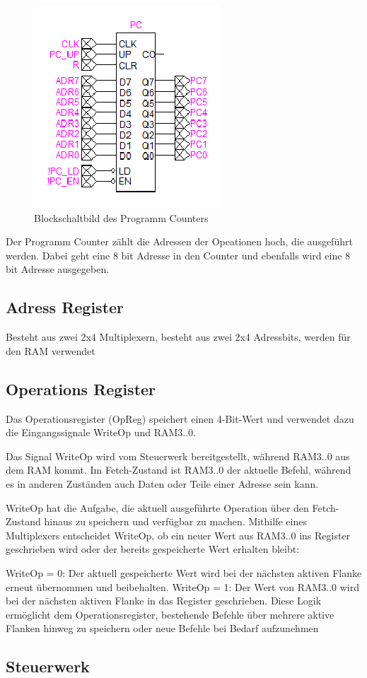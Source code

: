 \begin{figure}[ht]
  \centering
  \includegraphics[scale=0.6]
  {content/figures/Blockschaltbild-programm-counter.png}
  \caption{Blockschaltbild des Programm Counters}
  \label{fig:blockschaltbild-pc}
\end{figure}

Der Programm Counter zählt die Adressen der Opeationen hoch, die ausgeführt werden. Dabei geht eine 8 bit Adresse in den Counter und ebenfalls wird eine 8 bit Adresse ausgegeben.


\subsection{Adress Register}
\label{sec: adress-register}

Besteht aus zwei 2x4 Multiplexern, besteht aus zwei 2x4 Adressbits, werden für den RAM verwendet

\subsection{Operations Register}
\label{sec: operations-register}

Das Operationsregister (OpReg) speichert einen 4-Bit-Wert und verwendet dazu die Eingangssignale WriteOp und RAM3..0.

Das Signal WriteOp wird vom Steuerwerk bereitgestellt, während RAM3..0 aus dem RAM kommt. Im Fetch-Zustand ist RAM3..0 der aktuelle Befehl, während es in anderen Zuständen auch Daten oder Teile einer Adresse sein kann.

WriteOp hat die Aufgabe, die aktuell ausgeführte Operation über den Fetch-Zustand hinaus zu speichern und verfügbar zu machen. Mithilfe eines Multiplexers entscheidet WriteOp, ob ein neuer Wert aus RAM3..0 ins Register geschrieben wird oder der bereits gespeicherte Wert erhalten bleibt:

WriteOp = 0: Der aktuell gespeicherte Wert wird bei der nächsten aktiven Flanke erneut übernommen und beibehalten.
WriteOp = 1: Der Wert von RAM3..0 wird bei der nächsten aktiven Flanke in das Register geschrieben.
Diese Logik ermöglicht dem Operationsregister, bestehende Befehle über mehrere aktive Flanken hinweg zu speichern oder neue Befehle bei Bedarf aufzunehmen

\subsection{Steuerwerk}
\label{sec:steuerwerk}